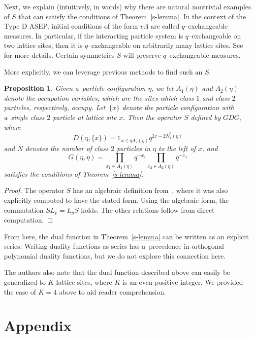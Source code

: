 \documentclass[pdftex]{sigma}
\numberwithin{equation}{section}
\newtheorem{Proposition}[Theorem]{Proposition}
\theoremstyle{definition}
\begin{document}
Next, we explain (intuitively, in words) why there are natural nontrivial examples of $S$ that can satisfy the conditions of Theorem~\ref{s-lemma}. In the context of the Type D ASEP, initial conditions of the form $v\Lambda$ are called $q$--exchangeable measures. In particular, if the interacting particle system is $q$--exchangeable on two lattice sites, then it is $q$--exchangeable on arbitrarily many lattice sites. See~\cite{kuan2024qexchangeablemeasurestransformationsinteracting} for more details. Certain symmetries $S$ will preserve $q$--exchangeable measures.

More explicitly, we can leverage previous methods to find such an $S$.
\begin{Proposition}
Given a~particle configuration $\eta$, we let $A_1(\eta)$ and $A_2(\eta)$ denote the occupation variables, which are the sites which class $1$ and class $2$ particles, respectively, occupy. Let~$\{x\}$ denote the particle configuration with a~single class $2$ particle at lattice site $x$. Then the operator $S$ defined by $GDG$, where
 \[D(\eta, \{x\}) = \mathds{1}_{x \in q A_2(\eta)} q^{2x - 2\overline{N}_x^2(\eta)}\]
 and $\overline{N}$ denotes the number of class $2$ particles in $\eta$ to the left of $x$, and
 \[
G(\eta,\eta)=\prod_{x_1 \in A_1(\eta)} q^{-x_1} \prod_{x_2 \in A_2(\eta)} q^{-x_2}
 \]
 satisfies the conditions of Theorem~{\rm\ref{s-lemma}}.
\end{Proposition}
\begin{proof}
 The operator $S$ has an algebraic definition from~\cite{kuan2020interactingparticlesystemstype}, where it was also explicitly computed to have the stated form. Using the algebraic form, the commutation $SL_p=L_pS$ holds. The other relations follow from direct computation.
\end{proof}

From here, the dual function in Theorem~\ref{s-lemma} can be written as an explicit series. Writing duality functions as series has a~precedence in orthogonal polynomial duality functions, but we do not explore this connection here.

The authors also note that the dual function described above can easily be generalized to $K$ lattice sites, where $K$ is an even positive integer. We provided the case of $K=4$ above to aid reader comprehension.

\appendix

\section{Appendix} \label{section--Appendix}
\end{document}
